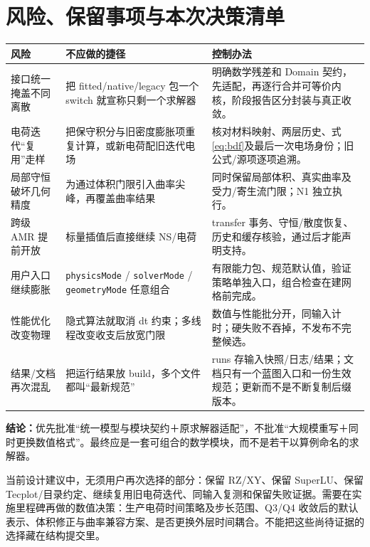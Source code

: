 \documentclass[UTF8,a4paper,11pt,fontset=fandol]{ctexart}
\numberwithin{equation}{section}
\newcommand{\code}[1]{\nolinkurl{#1}}
\newcommand{\decision}[1]{\par\noindent\colorbox{pale}{\parbox{\dimexpr\textwidth-2\fboxsep\relax}{\textbf{结论：}#1}}\par}
\begin{document}
\section{风险、保留事项与本次决策清单}
\begin{longtable}{@{}P{.22\textwidth}P{.42\textwidth}P{.30\textwidth}@{}}
\toprule 风险 & 不应做的捷径 & 控制办法\\\midrule\endhead
接口统一掩盖不同离散 & 把 fitted/native/legacy 包一个 switch 就宣称只剩一个求解器 & 明确数学残差和 Domain 契约，先适配，再逐行合并可等价内核，阶段报告区分封装与真正收敛。\\
电荷迭代“复用”走样 & 把保守积分与旧密度膨胀项重复计算，或新电荷配旧迭代电场 & 核对材料映射、两层历史、式\eqref{eq:bdf}及最后一次电场身份；旧公式/源项逐项追溯。\\
局部守恒破坏几何精度 & 为通过体积门限引入曲率尖峰，再覆盖曲率结果 & 同时保留局部体积、真实曲率及受力/寄生流门限；N1 独立执行。\\
跨级 AMR 提前开放 & 标量插值后直接继续 NS/电荷 & transfer 事务、守恒/散度恢复、历史和缓存核验，通过后才能声明支持。\\
用户入口继续膨胀 & \code{physicsMode} / \code{solverMode} / \code{geometryMode} 任意组合 & 有限能力包、规范默认值，验证策略单独入口，组合检查在建网格前完成。\\
性能优化改变物理 & 隐式算法就取消 dt 约束；多线程改变收支后放宽门限 & 数值与性能批分开，同输入计时；硬失败不吞掉，不发布不完整候选。\\
结果/文档再次混乱 & 把运行结果放 build，多个文件都叫“最新规范” & runs 存输入快照/日志/结果；文档只有一个蓝图入口和一份生效规范；更新而不是不断复制后缀版本。\\
\bottomrule
\end{longtable}

\decision{优先批准“统一模型与模块契约＋原求解器适配”，不批准“大规模重写＋同时更换数值格式”。最终应是一套可组合的数学模块，而不是若干以算例命名的求解器。}

当前设计建议中，无须用户再次选择的部分：保留 RZ/XY、保留 SuperLU、保留 Tecplot/目录约定、继续复用旧电荷迭代、同输入复测和保留失败证据。需要在实施里程碑再做的数值决策：生产电荷时间策略及步长范围、Q3/Q4 收敛后的默认表示、体积修正与曲率兼容方案、是否更换外层时间耦合。不能把这些尚待证据的选择藏在结构提交里。

\appendix
\end{document}

